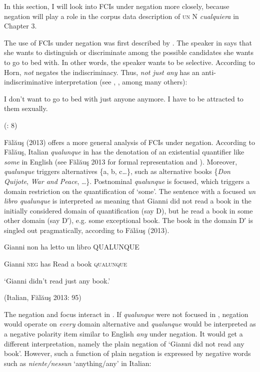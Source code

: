 \documentclass[output=paper]{langscibook}
\begin{document}
In this section, I will look into FCIs under negation more closely, because negation will play a role in the corpus data description of \textsc{un} N \textit{cualquiera} in Chapter 3.

  The use of FCIs under negation was first described by \citet{Horn2000}. The speaker in  says that she wants to distinguish or discriminate among the possible candidates she wants to go to bed with. In other words, the speaker wants to be selective. According to Horn, \textit{not} negates the indiscriminacy. Thus, \textit{not just any} has an anti-indiscriminative interpretation (see \citealt{Horn2000}, \citealt{AloniPort2013}, among many others):

\label{bkm:Ref42805181}  I don’t want to go to bed with just anyone anymore. I have to be attracted to them sexually.

  (\citealt{AloniEtAl2011}: 8)

Fălăuş (2013) offers a more general analysis of FCIs under negation. According to Fălăuş, Italian \textit{qualunque} in  has the denotation of an existential quantifier like \textit{some} in English (see Fălăuş 2013 for formal representation and ). Moreover, \textit{qualunque} triggers alternatives \{a, b, c…\}, such as alternative books \{\textit{Don Quijote}, \textit{War and Peace}, …\}. Postnominal \textit{qualunque} is focused, which triggers a domain restriction on the quantification of ‘some’. The sentence with a focused \textit{un libro qualunque} is interpreted as meaning that Gianni did not read a book in the initially considered domain of quantification (say D), but he read a book in some other domain (say D′), e.g. some exceptional book. The book in the domain D′ is singled out pragmatically, according to Fălăuş (2013).

\label{bkm:Ref42805226}  Gianni  non  ha  letto  un  libro  \MakeUppercase{qualunque}

  Gianni  \textsc{neg}  has  Read  a  book  \textsc{qualunque}

  ‘Gianni didn’t read just any book.’

  (Italian, Fălăuş 2013: 95)

The negation and focus interact in . If \textit{qualunque} were not focused in , negation would operate on \textit{every} domain alternative and \textit{qualunque} would be interpreted as a negative polarity item similar to English \textit{any} under negation. It would get a different interpretation, namely the plain negation of ‘Gianni did not read any book’. However, such a function of plain negation is expressed by negative words such as \textit{niente/nessun} ‘anything/any’ in Italian:
\end{document}
